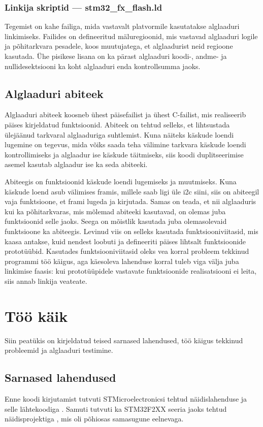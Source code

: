 \documentclass[12pt,a4paper]{article}
\begin{document}
\subsubsection{Linkija skriptid --- \textbf{stm32\_fx\_flash.ld}}
Tegemist on kahe failiga, mida vastavalt platvormile kasutatakse alglaaduri
linkimiseks. Failides on defineeritud mäluregioonid, mis vastavad alglaaduri
logile ja põhitarkvara pesadele, koos muutujatega, et alglaadurist neid regioone
kasutada. Ühe pisikese lisana on ka pärast alglaaduri koodi-, andme- ja
nullidesektsiooni ka koht alglaaduri enda kontrollsumma jaoks.

\subsection{Alglaaduri abiteek}
Alglaaduri abiteek koosneb ühest päisefailist ja ühest C-failist, mis
realiseerib päises kirjeldatud funktsioonid. Abiteek on tehtud selleks, et
lihtsustada ülejäänud tarkvaral alglaaduriga suhtlemist. Kuna näiteks käskude
loendi lugemine on tegevus, mida võiks saada teha välimine tarkvara käskude
loendi kontrollimiseks ja alglaadur ise käskude täitmiseks, siis koodi
duplitseerimise asemel kasutab alglaadur ise ka seda abiteeki.

Abiteegis on funktsioonid käskude loendi lugemiseks ja muutmiseks. Kuna käskude
loend asub välimises \gls{fram}is, millele saab ligi üle \gls{i2c} siini, siis
on abiteegil vaja funktsioone, et \gls{fram}i lugeda ja kirjutada. Samas on
teada, et nii alglaaduris kui ka põhitarkvaras, mis mõlemad abiteeki kasutavad,
on olemas juba funktsioonid selle jaoks. Seega on mõistlik kasutada juba
olemasolevaid funktsioone ka abiteegis. Levinud viis on selleks kasutada
funktsiooniviitasid, mis kaasa antakse, kuid nendest loobuti ja defineeriti
päises lihtsalt funktsioonide prototüübid. Kasutades funktsiooniviitasid oleks
vea korral probleem tekkinud programmi töö käigus, aga käesoleva lahenduse
korral tuleb viga välja juba linkimise faasis: kui prototüüpidele vastavate
funktsioonide realisatsiooni ei leita, siis annab linkija veateate.

\section{Töö käik}
Siin peatükis on kirjeldatud teised sarnased lahendused, töö käigus tekkinud
probleemid ja alglaaduri testimine.
\subsection{Sarnased lahendused}
Enne koodi kirjutamist tutvuti STMicroelectronicsi tehtud näidislahenduse ja
selle lähtekoodiga \cite{f1IAP}. Samuti tutvuti ka STM32F2XX seeria jaoks tehtud
näidisprojektiga \cite{f2IAP}, mis oli põhiosas samasugune eelnevaga.
\end{document}
